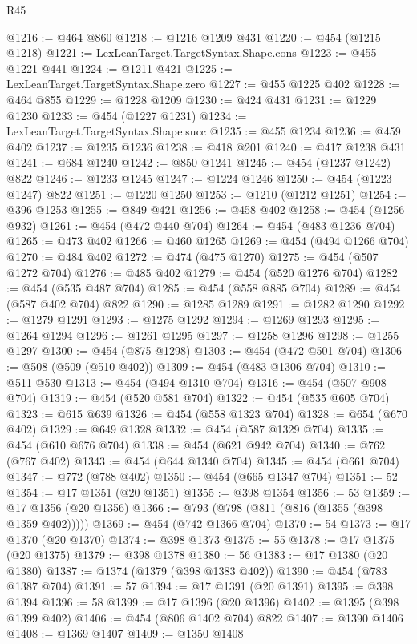 \begin{lexlean}{R45}
\begin{coremodule}
@1216 := @464 @860
@1218 := @1216 @1209 @431
@1220 := @454 (@1215 @1218)
@1221 := LexLeanTarget.TargetSyntax.Shape.cons
@1223 := @455 @1221 @441
@1224 := @1211 @421
@1225 := LexLeanTarget.TargetSyntax.Shape.zero
@1227 := @455 @1225 @402
@1228 := @464 @855
@1229 := @1228 @1209
@1230 := @424 @431
@1231 := @1229 @1230
@1233 := @454 (@1227 @1231)
@1234 := LexLeanTarget.TargetSyntax.Shape.succ
@1235 := @455 @1234
@1236 := @459 @402
@1237 := @1235 @1236
@1238 := @418 @201
@1240 := @417 @1238 @431
@1241 := @684 @1240
@1242 := @850 @1241
@1245 := @454 (@1237 @1242) @822
@1246 := @1233 @1245
@1247 := @1224 @1246
@1250 := @454 (@1223 @1247) @822
@1251 := @1220 @1250
@1253 := @1210 (@1212 @1251)
@1254 := @396 @1253
@1255 := @849 @421
@1256 := @458 @402
@1258 := @454 (@1256 @932)
@1261 := @454 (@472 @440 @704)
@1264 := @454 (@483 @1236 @704)
@1265 := @473 @402
@1266 := @460 @1265
@1269 := @454 (@494 @1266 @704)
@1270 := @484 @402
@1272 := @474 (@475 @1270)
@1275 := @454 (@507 @1272 @704)
@1276 := @485 @402
@1279 := @454 (@520 @1276 @704)
@1282 := @454 (@535 @487 @704)
@1285 := @454 (@558 @885 @704)
@1289 := @454 (@587 @402 @704) @822
@1290 := @1285 @1289
@1291 := @1282 @1290
@1292 := @1279 @1291
@1293 := @1275 @1292
@1294 := @1269 @1293
@1295 := @1264 @1294
@1296 := @1261 @1295
@1297 := @1258 @1296
@1298 := @1255 @1297
@1300 := @454 (@875 @1298)
@1303 := @454 (@472 @501 @704)
@1306 := @508 (@509 (@510 @402))
@1309 := @454 (@483 @1306 @704)
@1310 := @511 @530
@1313 := @454 (@494 @1310 @704)
@1316 := @454 (@507 @908 @704)
@1319 := @454 (@520 @581 @704)
@1322 := @454 (@535 @605 @704)
@1323 := @615 @639
@1326 := @454 (@558 @1323 @704)
@1328 := @654 (@670 @402)
@1329 := @649 @1328
@1332 := @454 (@587 @1329 @704)
@1335 := @454 (@610 @676 @704)
@1338 := @454 (@621 @942 @704)
@1340 := @762 (@767 @402)
@1343 := @454 (@644 @1340 @704)
@1345 := @454 (@661 @704)
@1347 := @772 (@788 @402)
@1350 := @454 (@665 @1347 @704)
@1351 := 52
@1354 := @17 @1351 (@20 @1351)
@1355 := @398 @1354
@1356 := 53
@1359 := @17 @1356 (@20 @1356)
@1366 := @793 (@798 (@811 (@816 (@1355 (@398 @1359 @402)))))
@1369 := @454 (@742 @1366 @704)
@1370 := 54
@1373 := @17 @1370 (@20 @1370)
@1374 := @398 @1373
@1375 := 55
@1378 := @17 @1375 (@20 @1375)
@1379 := @398 @1378
@1380 := 56
@1383 := @17 @1380 (@20 @1380)
@1387 := @1374 (@1379 (@398 @1383 @402))
@1390 := @454 (@783 @1387 @704)
@1391 := 57
@1394 := @17 @1391 (@20 @1391)
@1395 := @398 @1394
@1396 := 58
@1399 := @17 @1396 (@20 @1396)
@1402 := @1395 (@398 @1399 @402)
@1406 := @454 (@806 @1402 @704) @822
@1407 := @1390 @1406
@1408 := @1369 @1407
@1409 := @1350 @1408

\end{coremodule}
\end{lexlean}
